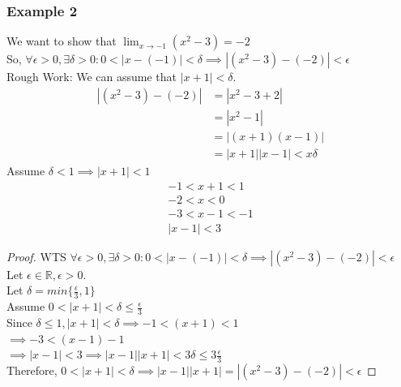 \documentclass{article}
\begin{document}
\subsubsection{Example 2}
We want to show that $\lim_{x \to -1} (x^2 - 3) = -2$\\
So, $\forall \epsilon > 0, \exists \delta > 0 : 0 < | x - (-1) | < \delta \implies | (x^2 - 3) - (-2) | < \epsilon$\\
Rough Work: We can assume that $| x + 1 | < \delta$.
\begin{align*}
    | (x^2 - 3) - (-2) | & = | x^2 - 3 + 2 |\\
    & = | x^2 - 1 |\\
    & = | (x+1)(x-1) |\\
    & = | x + 1 | | x - 1 | < x\delta
\end{align*}
Assume $\delta < 1 \implies | x + 1 | < 1$\\
\begin{align*}
    -1 < x + 1 < 1\\
    -2 < x < 0\\
    -3 < x - 1 < - 1\\
    | x - 1 | < 3
\end{align*}
\begin{proof} WTS $\forall \epsilon > 0, \exists \delta > 0 : 0 < | x - (-1) | < \delta \implies | (x^2 - 3) - (-2) | < \epsilon$\\
Let $\epsilon \in \mathbb{R}, \epsilon > 0$.\\
Let $\delta = min\{ \frac{\epsilon}{3}, 1 \}$\\
Assume $0 < | x + 1 | < \delta \leq \frac{\epsilon}{3}$\\
Since $\delta \leq 1, | x + 1 | < \delta \implies -1 < (x + 1) < 1$\\
$\implies -3 < (x - 1) - 1$\\
$\implies | x - 1 | < 3 \implies | x - 1 | | x + 1 | < 3 \delta \leq 3 \frac{\epsilon}{3} $\\
Therefore, $ 0 < | x + 1 | < \delta \implies | x - 1 | | x + 1 | = | (x^2 -3) - (-2) | < \epsilon$
\end{proof}
\end{document}
